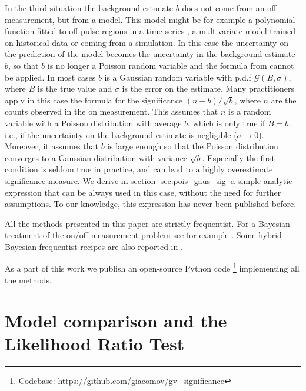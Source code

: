 \documentclass[twocolumn]{aastex61}
\renewcommand{\textbf}{}
\begin{document}
    In the third situation the background estimate $b$ does not come from an off measurement, but from a  model. This model might be for example a polynomial function fitted to off-pulse regions in a time series \citep{GBMCatalog}, a multivariate model trained on historical data \citep{Szecsietal2013,Vasileiou2013} or coming from a simulation. In this case the uncertainty on the prediction of the model becomes the uncertainty in the background estimate $b$, so that $b$ is no longer a Poisson random variable and the formula from \citet{LiMa} cannot be applied. In most cases $b$ is a Gaussian random variable with p.d.f $\mathcal{G}(B, \sigma)$, where $B$ is the true value and $\sigma$ is the error on the estimate. \textbf{Many practitioners apply in this case the formula for the significance $(n - b)/\sqrt{b}$, where $n$ are the counts observed in the on measurement. This assumes that $n$ is a random variable with a Poisson distribution with average $b$, which is only true if $B=b$, i.e., if the uncertainty on the background estimate is negligible ($\sigma \rightarrow 0$). Moreover, it assumes that $b$ is large enough so that the Poisson distribution converges to a Gaussian distribution with variance $\sqrt{b}$. Especially the first condition is seldom true in practice, and can lead to a highly overestimate significance measure}. We derive in section \ref{sec:pois_gaus_sig} a simple analytic expression that can be always used in this case, without the need for further assumptions. To our knowledge, this expression has never been published before.

All the methods presented in this paper are strictly frequentist. For a Bayesian treatment of the on/off measurement problem see for example \citet{Gillessenetal2005}. \textbf{Some hybrid Bayesian-frequentist recipes are also reported in \citet{Cousins2008}.}

\textbf{As a part of this work we publish an open-source Python code \citep[][]{Vianello2018}\footnote{Codebase: \url{https://github.com/giacomov/gv\_significance}} implementing all the methods.}

\section{Model comparison and the Likelihood Ratio Test}
    
\end{document}
